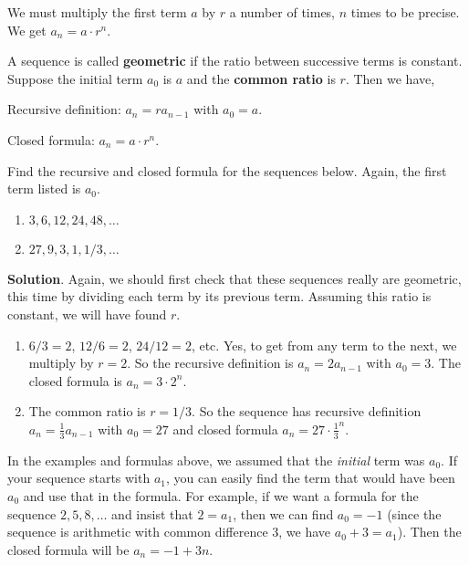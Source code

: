 \documentclass[11pt,]{book}
\newcommand{\terminology}[1]{\textbf{#1}}
\theoremstyle{ptxplainnotitle}
\theoremstyle{ptxplaintitle}
\theoremstyle{ptxdefinitionnotitle}
\theoremstyle{ptxdefinitiontitle}
\theoremstyle{ptxdefinitionnotitle}
\theoremstyle{ptxdefinitiontitle}
\theoremstyle{ptxdefinitionnotitle}
\theoremstyle{ptxdefinitiontitle}
\theoremstyle{ptxdefinitiontitlenonumber}
\theoremstyle{ptxdefinitiontitlenonumber}
\numberwithin{equation}{chapter}
\begin{document}
We must multiply the first term \(a\) by \(r\) a number of times, \(n\) times to be precise. We get \(a_n = a\cdot r^{n}\).%
\begin{assemblage}\label{assemblage-4}
\hypertarget{p-162}{}%
A sequence is called \terminology{geometric} if the ratio between successive terms is constant. Suppose the initial term \(a_0\) is \(a\) and the \terminology{common ratio} is \(r\). Then we have,%
\par
\hypertarget{p-163}{}%
Recursive definition: \(a_n = ra_{n-1}\) with \(a_0 = a\).%
\par
\hypertarget{p-164}{}%
Closed formula: \(a_n = a\cdot r^{n}\).%
\end{assemblage}
\begin{example}\label{example-6}
\hypertarget{p-165}{}%
Find the recursive and closed formula for the sequences below. Again, the first term listed is \(a_0\). \leavevmode%
\begin{enumerate}
\item\hypertarget{li-105}{}\(3, 6, 12, 24, 48, \ldots\)%
\item\hypertarget{li-106}{}\(27, 9, 3, 1, 1/3, \ldots\)%
\end{enumerate}
%
\par\smallskip%
\noindent\textbf{Solution}.\hypertarget{solution-12}{}\quad%
\hypertarget{p-166}{}%
Again, we should first check that these sequences really are geometric, this time by dividing each term by its previous term.  Assuming this ratio is constant, we will have found \(r\). \leavevmode%
\begin{enumerate}
\item\hypertarget{li-107}{}\(6/3 = 2\), \(12/6 = 2\), \(24/12 = 2\), etc. Yes, to get from any term to the next, we multiply by \(r = 2\). So the recursive definition is \(a_n = 2a_{n-1}\) with \(a_0 = 3\). The closed formula is \(a_n = 3\cdot 2^{n}\).%
\item\hypertarget{li-108}{}\hypertarget{p-167}{}%
The common ratio is \(r = 1/3\). So the sequence has recursive definition \(a_n = \frac{1}{3}a_{n-1}\) with \(a_0 = 27\) and closed formula \(a_n = 27\cdot \frac{1}{3}^{n}\).%
\end{enumerate}
%
\end{example}
\hypertarget{p-168}{}%
In the examples and formulas above, we assumed that the \emph{initial} term was \(a_0\). If your sequence starts with \(a_1\), you can easily find the term that would have been \(a_0\) and use that in the formula. For example, if we want a formula for the sequence \(2, 5, 8,\ldots\) and insist that \(2= a_1\), then we can find \(a_0 = -1\) (since the sequence is arithmetic with common difference 3, we have \(a_0 + 3 = a_1\)). Then the closed formula will be \(a_n = -1 + 3n\).%
\end{document}
